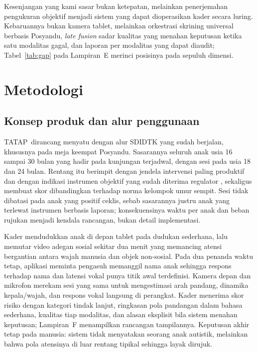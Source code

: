 \documentclass[10pt,letterpaper]{article}
\newcommand{\produk}{TATAP}
\begin{document}
Kesenjangan yang kami sasar bukan ketepatan, melainkan penerjemahan pengukuran objektif
menjadi sistem yang dapat dioperasikan kader secara luring. Kebaruannya bukan kamera tablet,
melainkan orkestrasi skrining universal berbasis Posyandu, \textit{late fusion} sadar kualitas
yang menahan keputusan ketika satu modalitas gagal, dan laporan per modalitas yang dapat
diaudit; Tabel~\ref{tab:gap} pada Lampiran~E merinci posisinya pada sepuluh dimensi.


\section{Metodologi}

\subsection{Konsep produk dan alur penggunaan}

\produk\ dirancang menyatu dengan alur SDIDTK yang sudah berjalan, khususnya pada meja keempat
Posyandu. Sasarannya seluruh anak usia 16 sampai 30 bulan yang hadir pada kunjungan
terjadwal, dengan sesi pada usia 18 dan 24 bulan. Rentang itu berimpit dengan jendela
intervensi paling produktif dan dengan indikasi instrumen objektif yang sudah diterima
regulator \cite{earlitec2023}, sekaligus membuat skor dibandingkan terhadap norma kelompok
umur sempit. Sesi tidak dibatasi pada anak yang positif ceklis, sebab sasarannya justru anak
yang terlewat instrumen berbasis laporan; konsekuensinya waktu per anak dan beban rujukan
menjadi kendala rancangan, bukan detail implementasi.

Kader mendudukkan anak di depan tablet pada dudukan sederhana, lalu memutar video adegan
sosial sekitar dua menit yang memancing atensi bergantian antara wajah manusia dan objek
non-sosial. Pada dua penanda waktu tetap, aplikasi meminta pengasuh memanggil nama anak
sehingga respons terhadap nama dan latensi vokal punya titik awal terdefinisi. Kamera depan
dan mikrofon merekam sesi yang sama untuk mengestimasi arah pandang, dinamika kepala/wajah,
dan respons vokal langsung di perangkat. Kader menerima skor risiko dengan kategori tindak
lanjut, ringkasan pola pandangan dalam bahasa sederhana, kualitas tiap modalitas, dan alasan
eksplisit bila sistem menahan keputusan; Lampiran~F menampilkan rancangan tampilannya.
Keputusan akhir tetap pada manusia: sistem tidak menyatakan seorang anak autistik, melainkan
bahwa pola atensinya di luar rentang tipikal sehingga layak dirujuk.
\end{document}
